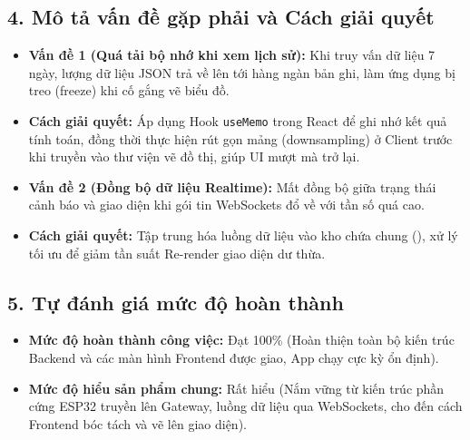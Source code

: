 \documentclass{article}
\begin{document}
\subsection*{4. Mô tả vấn đề gặp phải và Cách giải quyết}
\begin{itemize}
    \item \textbf{Vấn đề 1 (Quá tải bộ nhớ khi xem lịch sử):} Khi truy vấn dữ liệu 7 ngày, lượng dữ liệu JSON trả về lên tới hàng ngàn bản ghi, làm ứng dụng bị treo (freeze) khi cố gắng vẽ biểu đồ. 
    \item \textbf{Cách giải quyết:} Áp dụng Hook \texttt{useMemo} trong React để ghi nhớ kết quả tính toán, đồng thời thực hiện rút gọn mảng (downsampling) ở Client trước khi truyền vào thư viện vẽ đồ thị, giúp UI mượt mà trở lại.
    \item \textbf{Vấn đề 2 (Đồng bộ dữ liệu Realtime):} Mất đồng bộ giữa trạng thái cảnh báo và giao diện khi gói tin WebSockets đổ về với tần số quá cao.
    \item \textbf{Cách giải quyết:} Tập trung hóa luồng dữ liệu vào kho chứa chung (), xử lý tối ưu để giảm tần suất Re-render giao diện dư thừa.
\end{itemize}

\subsection*{5. Tự đánh giá mức độ hoàn thành}
\begin{itemize}
    \item \textbf{Mức độ hoàn thành công việc:} Đạt 100\% (Hoàn thiện toàn bộ kiến trúc Backend và các màn hình Frontend được giao, App chạy cực kỳ ổn định).
    \item \textbf{Mức độ hiểu sản phẩm chung:} Rất hiểu (Nắm vững từ kiến trúc phần cứng ESP32 truyền lên Gateway, luồng dữ liệu qua WebSockets, cho đến cách Frontend bóc tách và vẽ lên giao diện).
\end{itemize}
\end{document}
